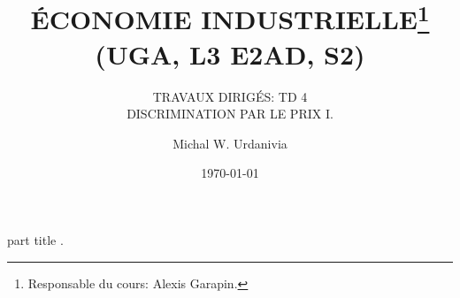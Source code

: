 
\usepackage[svgnames]{xcolor}
\usepackage{tikz}
\usetikzlibrary{shapes.geometric, arrows}
\usepackage{enumerate}   
\usepackage{multirow}
\usepackage{txfonts}
\usepackage{mathrsfs}
\usepackage{pgfplots}
\pgfplotsset{compat = newest}
\usetikzlibrary{positioning, arrows.meta}
\newcommand{\A}{(0,0) ++(135:2) circle (2)}
\newcommand{\B}{(0,0) ++(45:2) circle (2)}
\DeclareMathOperator{\C}{C}
\DeclareMathOperator{\util}{u}
%
  \usepackage{eso-pic}

{
    \begin{centering}
    \begin{beamercolorbox}[sep=11pt,center]{part title}
    \thesection.~\insertsection\par
    \end{beamercolorbox}
    \end{centering}
}
\title[]{ \textbf{ÉCONOMIE INDUSTRIELLE}\footnote{Responsable du cours: Alexis Garapin.}\\(\textbf{UGA, L3 E2AD, S2})}
\subtitle{TRAVAUX DIRIGÉS: TD 4 \\  DISCRIMINATION PAR LE PRIX I.}
\date{\today}
\author{Michal W. Urdanivia\inst{*}}

